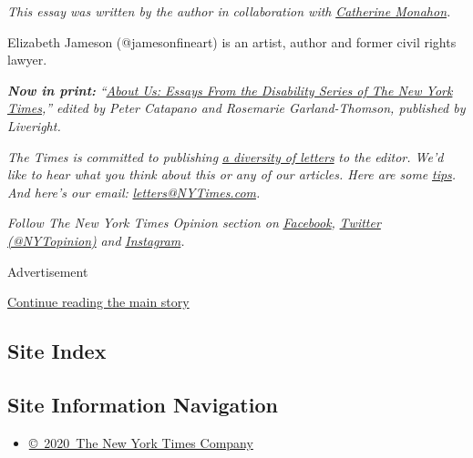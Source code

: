 \emph{This essay was written by the author in collaboration with}
\href{http://www.cxmdesigns.com/}{\emph{Catherine Monahon}}\emph{.}

Elizabeth Jameson (@jamesonfineart) is an artist, author and former
civil rights lawyer.

\emph{\textbf{Now in print:}}
\emph{``}\href{https://www.aboutusbook.com/}{\emph{About Us: Essays From
the Disability Series of The New York Times}}\emph{,'' edited by Peter
Catapano and Rosemarie Garland-Thomson, published by Liveright.}

\emph{The Times is committed to publishing}
\href{https://www.nytimes3xbfgragh.onion/2019/01/31/opinion/letters/letters-to-editor-new-york-times-women.html}{\emph{a
diversity of letters}} \emph{to the editor. We'd like to hear what you
think about this or any of our articles. Here are some}
\href{https://help.nytimes3xbfgragh.onion/hc/en-us/articles/115014925288-How-to-submit-a-letter-to-the-editor}{\emph{tips}}\emph{.
And here's our email:}
\href{mailto:letters@NYTimes.com}{\emph{letters@NYTimes.com}}\emph{.}

\emph{Follow The New York Times Opinion section on}
\href{https://www.facebookcorewwwi.onion/nytopinion}{\emph{Facebook}}\emph{,}
\href{http://twitter.com/NYTOpinion}{\emph{Twitter (@NYTopinion)}}
\emph{and}
\href{https://www.instagram.com/nytopinion/}{\emph{Instagram}}\emph{.}

Advertisement

\protect\hyperlink{after-bottom}{Continue reading the main story}

\hypertarget{site-index}{%
\subsection{Site Index}\label{site-index}}

\hypertarget{site-information-navigation}{%
\subsection{Site Information
Navigation}\label{site-information-navigation}}

\begin{itemize}
\tightlist
\item
  \href{https://help.nytimes3xbfgragh.onion/hc/en-us/articles/115014792127-Copyright-notice}{©~2020~The
  New York Times Company}
\end{itemize}

